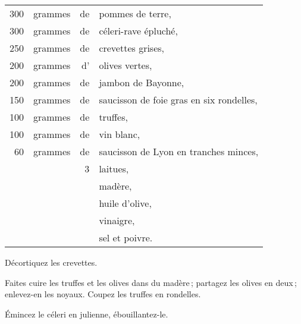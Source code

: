 \footnotesize
\begin{longtable}{rrrp{16em}}
    300 & grammes & de & pommes de terre,                                                                 \\
    300 & grammes & de & céleri-rave épluché,                                                             \\
    250 & grammes & de & crevettes grises,                                                                \\
    200 & grammes & d' & olives vertes,                                                                   \\
    200 & grammes & de & jambon de Bayonne,                                                               \\
    150 & grammes & de & saucisson de foie gras en six rondelles,                                         \\
    100 & grammes & de & truffes,                                                                         \\
    100 & grammes & de & vin blanc,                                                                       \\
     60 & grammes & de & saucisson de Lyon en tranches minces,                                            \\
        &         &  3 & laitues,                                                                         \\
        &         &    & madère,                                                                          \\
        &         &    & huile d'olive,                                                                   \\
        &         &    & vinaigre,                                                                        \\
        &         &    & sel et poivre.                                                                   \\
\end{longtable}
\normalsize

Décortiquez les crevettes.

Faites cuire les truffes et les olives dans du madère ; partagez les olives en
deux ; enlevez-en les noyaux. Coupez les truffes en rondelles.

Émincez le céleri en julienne, ébouillantez-le.

